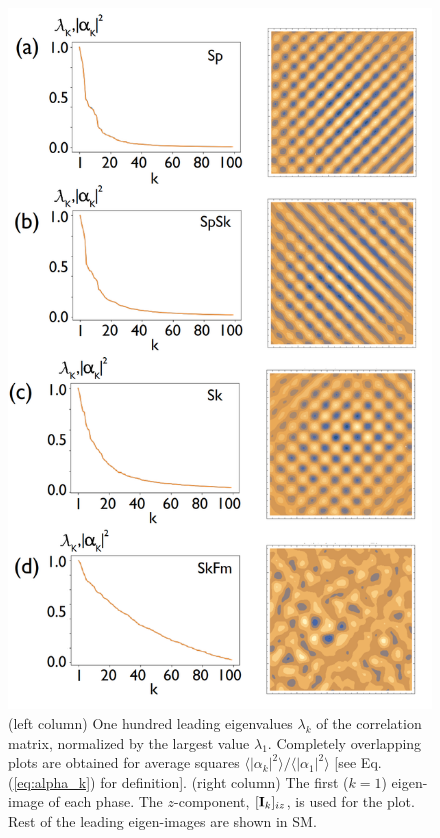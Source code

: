 \documentclass[reprint,amsmath,amssymb,aps,showpacs,superscriptaddress,prl]{revtex4-1}
\begin{document}
\begin{figure}[h]
\includegraphics[scale=0.3]{fig1.png}
\caption{(left column) One hundred leading eigenvalues $\lambda_k$ of the correlation matrix, normalized by the largest value $\lambda_1$. Completely overlapping plots are obtained for average squares $\langle |\alpha_k |^2 \rangle / \langle |\alpha_1 |^2 \rangle$ [see Eq. (\ref{eq:alpha_k}) for definition]. (right column) The first ($k=1$) eigen-image of each phase. The $z$-component, $[{\bf I}_k ]_{iz}$, is used for the plot. Rest of the leading eigen-images are shown in SM. }\label{fig:0}
\end{figure}
\end{document}
